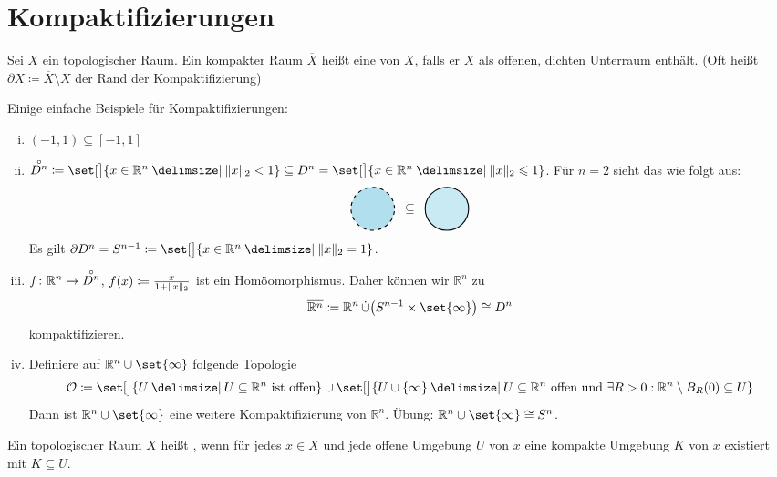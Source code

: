 \newpage
\section{Kompaktifizierungen} %

\begin{definition}[{name=[Kompaktifizierung]}]
	Sei $X$ ein topologischer Raum. Ein kompakter Raum $\overline{X}$ heißt eine  von $X$, falls er $X$ als offenen, dichten Unterraum enthält. 
	(Oft heißt $\partial X \coloneqq \overline{X} \setminus X $ der Rand der Kompaktifizierung)
\end{definition}

\begin{beispiel}[{name=[Kompaktifizierungen]}]
	Einige einfache Beispiele für Kompaktifizierungen:
	\begin{enumerate}[(i)]
		\item $(-1,1) \subseteq [-1,1]$
		\item $\interior{D^n} \coloneqq \set[\big]{x \in \mathbb{R}^n \given \norm{x}_2 < 1 } \subseteq D^n = \set[\big]{x \in \mathbb{R}^n \given \norm{x}_2 \le 1}$. Für $n=2$ sieht das wie folgt aus:
		\[
			\vcenter{\hbox{\tikz{\draw[dashed, fill=LightBlue2, thick] (0,0) circle[radius=0.6];}}} \enspace\subseteq \enspace
			\vcenter{\hbox{\tikz{\draw[fill=LightBlue2!70, thick] (0,0) circle[radius=0.6];}}}
		\]
		Es gilt $\partial D^n = S^{n-1} \coloneqq \set[\big]{x \in \mathbb{R}^n \given \norm{x}_2 = 1}$.
		\item $f \colon \mathbb{R}^n \to \interior{D^n}$, $f(x) \coloneqq \frac{x}{1+ \Vert x\Vert_2} $ ist ein Homöomorphismus. Daher können wir $\mathbb{R}^n$ zu
		\[
			\overline{\mathbb{R}^n} \coloneqq \mathbb{R}^n \mathop{\dot\cup} \enbrace*{S^{n-1} \times \set{\infty}}  \cong D^n 
		\]
		kompaktifizieren.
		\item Definiere auf $\mathbb{R}^n \cup \set{\infty}$ folgende Topologie 
		\[
			\mathcal{O} \coloneqq \set[\big]{U \given U \subseteq \mathbb{R}^n \text{ ist offen}} \cup \set[\big]{U \cup \{\infty\} \given U \subseteq \mathbb{R}^n \text{ offen und } \exists R > 0 : 
			\mathbb{R}^n \setminus B_R(0) \subseteq U} 
		\]
		Dann ist $\mathbb{R}^n \cup \set{\infty}$ eine weitere Kompaktifizierung von $\mathbb{R}^n$. Übung: $\mathbb{R}^n \cup \set{\infty} \cong S^n$.
	\end{enumerate}
\end{beispiel}

\begin{definition}[{name=[lokalkompakter Raum]}]
	Ein topologischer Raum $X$ heißt , wenn für jedes $x \in X$ und jede offene Umgebung $U$ von $x$ eine kompakte Umgebung $K$ von $x$ existiert mit $K \subseteq U$.
\end{definition}

